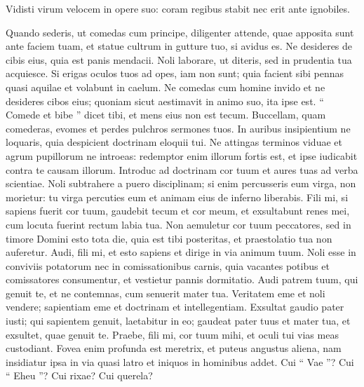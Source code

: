 \begin{biblechapter}
\begin{biblechapter}
\begin{biblechapter}
\begin{biblechapter}
\begin{biblechapter}
\begin{biblechapter}
\begin{biblechapter}
\begin{biblechapter}
\begin{biblechapter}
\begin{biblechapter}
\begin{biblechapter}
\begin{biblechapter}
\begin{biblechapter}
\begin{biblechapter}
\begin{biblechapter}
\begin{biblechapter}
\begin{biblechapter}
\begin{biblechapter}
\begin{biblechapter}
\begin{biblechapter}
\begin{biblechapter}
\begin{biblechapter}
 \verse Vidisti virum velocem in opere suo:
 coram regibus stabit nec erit ante ignobiles.
 
\begin{biblechapter}
 \verse Quando sederis, ut comedas cum principe,
 diligenter attende, quae apposita sunt ante faciem tuam,
 \verse et statue cultrum in gutture tuo,
 si avidus es.
 \verse Ne desideres de cibis eius,
 quia est panis mendacii.
 \verse Noli laborare, ut diteris,
 sed in prudentia tua acquiesce.
 \verse Si erigas oculos tuos ad opes, iam non sunt;
 quia facient sibi pennas quasi aquilae et volabunt in caelum.
 \verse Ne comedas cum homine invido
 et ne desideres cibos eius;
 \verse quoniam sicut aestimavit in animo suo,
 ita ipse est.
 “ Comede et bibe ” dicet tibi,
 et mens eius non est tecum.
 \verse Buccellam, quam comederas, evomes
 et perdes pulchros sermones tuos.
 \verse In auribus insipientium ne loquaris,
 quia despicient doctrinam eloquii tui.
 \verse Ne attingas terminos viduae
 et agrum pupillorum ne introeas:
 \verse redemptor enim illorum fortis est,
 et ipse iudicabit contra te causam illorum.
 \verse Introduc ad doctrinam cor tuum
 et aures tuas ad verba scientiae.
 \verse Noli subtrahere a puero disciplinam;
 si enim percusseris eum virga, non morietur:
 \verse tu virga percuties eum
 et animam eius de inferno liberabis.
 \verse Fili mi, si sapiens fuerit cor tuum,
 gaudebit tecum et cor meum,
 \verse et exsultabunt renes mei,
 cum locuta fuerint rectum labia tua.
 \verse Non aemuletur cor tuum peccatores,
 sed in timore Domini esto tota die,
 \verse quia est tibi posteritas,
 et praestolatio tua non auferetur.
 \verse Audi, fili mi, et esto sapiens
 et dirige in via animum tuum.
 \verse Noli esse in conviviis potatorum
 nec in comissationibus carnis,
 \verse quia vacantes potibus et comissatores consumentur,
 et vestietur pannis dormitatio.
 \verse Audi patrem tuum, qui genuit te,
 et ne contemnas, cum senuerit mater tua.
 \verse Veritatem eme et noli vendere;
 sapientiam eme et doctrinam et intellegentiam.
 \verse Exsultat gaudio pater iusti;
 qui sapientem genuit, laetabitur in eo;
 \verse gaudeat pater tuus et mater tua,
 et exsultet, quae genuit te.
 \verse Praebe, fili mi, cor tuum mihi,
 et oculi tui vias meas custodiant.
 \verse Fovea enim profunda est meretrix,
 et puteus angustus aliena,
 \verse nam insidiatur ipsa in via quasi latro
 et iniquos in hominibus addet.
 \verse Cui “ Vae ”? Cui “ Eheu ”?
 Cui rixae? Cui querela?

\end{biblechapter}
\end{biblechapter}
\end{biblechapter}
\end{biblechapter}
\end{biblechapter}
\end{biblechapter}
\end{biblechapter}
\end{biblechapter}
\end{biblechapter}
\end{biblechapter}
\end{biblechapter}
\end{biblechapter}
\end{biblechapter}
\end{biblechapter}
\end{biblechapter}
\end{biblechapter}
\end{biblechapter}
\end{biblechapter}
\end{biblechapter}
\end{biblechapter}
\end{biblechapter}
\end{biblechapter}
\end{biblechapter}
